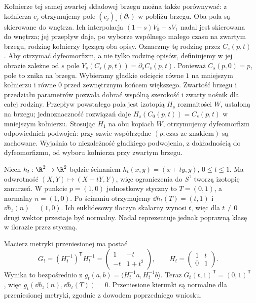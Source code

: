 Kołnierze tej samej zwartej
składowej brzegu można także
porównywać: z kołnierza $c_j$
otrzymujemy pole
$(c_j)_*(\partial_t)$ w pobliżu
brzegu. Oba pola są skierowane
do wnętrza. Ich interpolacja
$(1-s)V_0+sV_1$ nadal jest
skierowana do wnętrza;
jej przepływ daje, po wyborze
wspólnego małego czasu na
zwartym brzegu, rodzinę
kołnierzy łączącą oba opisy.
Oznaczmy tę rodzinę przez $C_s(p,t)$. Aby otrzymać
dyfeomorfizm, a nie tylko rodzinę opisów, definiujemy
w jej obrazie zależne od $s$ pole
$Y_s(C_s(p,t))=\partial_s C_s(p,t)$.
Ponieważ $C_s(p,0)=p$, pole to znika na brzegu.
Wybieramy gładkie odcięcie równe $1$ na mniejszym
kołnierzu i równe $0$ przed zewnętrznym końcem większego.
Zwartość brzegu i przedziału parametrów pozwala dobrać
wspólną szerokość i zwarty nośnik dla całej rodziny.
Przepływ powstałego pola jest izotopią $H_s$ rozmaitości
$W$, ustaloną na brzegu; jednoznaczność rozwiązań daje
$H_s(C_0(p,t))=C_s(p,t)$ w mniejszym kołnierzu.
Stosując $H_1$ na obu kopiach $W$, otrzymujemy
dyfeomorfizm odpowiednich podwojeń: przy szwie
współrzędne $(p,\text{czas ze znakiem})$ są zachowane.
Wyjaśnia to niezależność gładkiego podwojenia, z dokładnością
do dyfeomorfizmu, od wyboru kołnierza przy zwartym brzegu.

\begin{przyklad}
\label{prz:izotopia-scinanie-20}
Niech $h_t:\R^2\to\R^2$ będzie ścinaniem
$h_t(x,y)=(x+ty,y)$, $0\leq t\leq1$.
Ma odwrotność $(X,Y)\mapsto(X-tY,Y)$,
więc ograniczenia do $S^1$ tworzą izotopię zanurzeń.
W punkcie $p=(1,0)$ jednostkowy styczny to $T=(0,1)$,
a normalny $n=(1,0)$. Po ścinaniu otrzymujemy
$\dd h_t(T)=(t,1)$ i $\dd h_t(n)=(1,0)$.
Ich euklidesowy iloczyn skalarny wynosi $t$,
więc dla $t\ne0$ drugi wektor przestaje być normalny.
Nadal reprezentuje jednak poprawną klasę w ilorazie przez styczną.

Macierz metryki przeniesionej ma postać
\[
 G_t=(H_t^{-1})^{\mathsf T}H_t^{-1}
 =\begin{pmatrix}1&-t\\-t&1+t^2\end{pmatrix},
 \qquad H_t=\begin{pmatrix}1&t\\0&1\end{pmatrix}.
\]
Wynika to bezpośrednio z
$g_t(a,b)=\langle H_t^{-1}a,H_t^{-1}b\rangle$.
Teraz $G_t(t,1)^{\mathsf T}=(0,1)^{\mathsf T}$,
więc $g_t(\dd h_t(n),\dd h_t(T))=0$.
Przeniesione kierunki są normalne dla przeniesionej metryki,
zgodnie z dowodem poprzedniego wniosku.
\end{przyklad}


